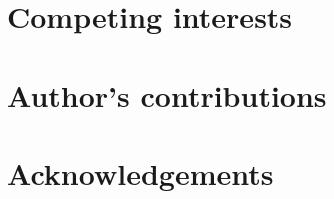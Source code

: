 \documentclass[twocolumn]{bmcart}%
\begin{document}

\begin{backmatter}

\section*{Competing interests}

\section*{Author's contributions}

\section*{Acknowledgements}




\end{backmatter}
\end{document}
